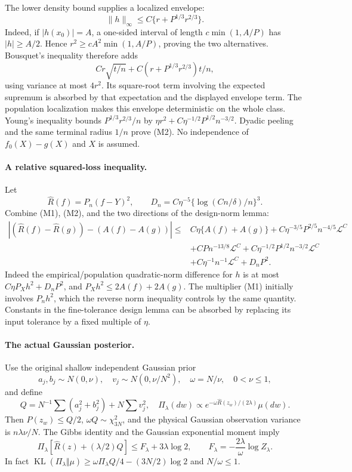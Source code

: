 The lower density bound supplies a localized envelope:
\[
 \|h\|_\infty\le C\{r+P^{1/3}r^{2/3}\}.
\]
Indeed, if $|h(x_0)|=A$, a one-sided interval of length
$c\min(1,A/P)$ has $|h|\ge A/2$. Hence
$r^2\ge c A^2\min(1,A/P)$, proving the two alternatives.
Bousquet's inequality therefore adds
\[
 Cr\sqrt{t/n}+C(r+P^{1/3}r^{2/3})t/n,
\]
using variance at most $4r^2$. Its square-root term involving the
expected supremum is absorbed by that expectation and the displayed
envelope term. The population localization makes this envelope
deterministic on the whole class. Young's inequality bounds
$P^{1/3}r^{2/3}/n$ by
$\eta r^2+C\eta^{-1/2}P^{1/2}n^{-3/2}$.
Dyadic peeling and the same terminal radius $1/n$ prove (M2).
No independence of $f_0(X)-g(X)$ and $X$ is assumed.

\paragraph{A relative squared-loss inequality.}
Let
\[
 \widehat R(f)=P_n(f-Y)^2,\qquad
 D_n=C\eta^{-5}\{\log(Cn/\delta)/n\}^{3}.
\]
Combine (M1), (M2), and the two directions of the design-norm lemma:
\begin{equation}
 \begin{aligned}
 |(\widehat R(f)-\widehat R(g))-(A(f)-A(g))|
 \le{}& C\eta\{A(f)+A(g)\}
 +C\eta^{-3/5}P^{2/5}n^{-4/5}\mathcal L^C\\
 &+CPn^{-13/8}\mathcal L^C
 +C\eta^{-1/2}P^{1/2}n^{-3/2}\mathcal L^C\\
 &+C\eta^{-1}n^{-1}\mathcal L^C+D_nP^2.
 \end{aligned}\tag{L}
\end{equation}
Indeed the empirical/population quadratic-norm difference for
$h$ is at most $C\eta P_Xh^2+D_nP^2$, and
$P_Xh^2\le2A(f)+2A(g)$. The multiplier (M1) initially involves
$P_nh^2$, which the reverse norm inequality controls by the same
quantity. Constants in the fine-tolerance design lemma can be
absorbed by replacing its input tolerance by a fixed multiple of
$\eta$.

\paragraph{The actual Gaussian posterior.}
Use the original shallow independent Gaussian prior
\[
 a_j,b_j\sim N(0,\nu),\quad v_j\sim N(0,\nu/N^2),
 \quad \omega=N/\nu,\quad 0<\nu\le1,
\]
and define
\[
 Q=N^{-1}\sum(a_j^2+b_j^2)+N\sum v_j^2,\quad
 \Pi_\lambda(dw)\propto
 e^{-\omega\widehat R(z_w)/(2\lambda)}\mu(dw).
\]
Then $P(z_w)\le Q/2$, $\omega Q\sim\chi^2_{3N}$, and the physical
Gaussian observation variance is $n\lambda\nu/N$.
The Gibbs identity and the Gaussian exponential moment imply
\[
 \Pi_\lambda[\widehat R(z)+(\lambda/2)Q]
 \le F_\lambda+3\lambda\log2,\qquad
 F_\lambda=-\frac{2\lambda}{\omega}\log Z_\lambda. \tag{G}
\]
In fact
$\operatorname{KL}(\Pi_\lambda\Vert\mu)
 \ge\omega\Pi_\lambda Q/4-(3N/2)\log2$ and $N/\omega\le1$.

